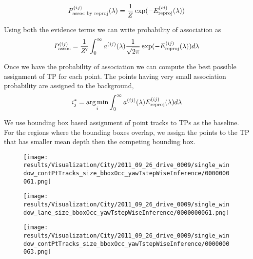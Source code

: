 \begin{align}
  P^{(ij)}_{\text{assoc by reproj}}(\lambda) = \frac{1}{Z}\exp(-E^{(ij)}_{\text{reproj}}(\lambda))
\end{align}

Using both the evidence terms we can write probability of association as
\begin{align}
  P^{(ij)}_{\text{assoc}} = \frac{1}{Z'}\int_0^{\infty} a^{(ij)}(\lambda) \frac{1}{\sqrt{2\pi}}\exp(-E^{(ij)}_{\text{reproj}}(\lambda))d\lambda
  \label{eq:prob-assoc}
\end{align}

Once we have the probability of association we can compute the best possible
assignment of TP for each point. The points having very small association
probability are assigned to the background,
\begin{align}
  i^*_{j} = \operatorname*{\arg\min}_{i} \int_0^\infty a^{(ij)}(\lambda) E^{(ij)}_{\text{reproj}}(\lambda) d\lambda
\end{align}

We use bounding box based assignment of point tracks to TPs as the baseline.
For the regions where the bounding boxes overlap, we assign the points to the
TP that has smaller mean depth then the competing bounding box.

\begin{figure}
        \texttt{[image: results/Visualization/City/2011\_09\_26\_drive\_0009/single\_window\_contPtTracks\_size\_bboxOcc\_yawTstepWiseInference/0000000061.png]}
\end{figure}
\begin{figure}
  \texttt{[image: results/Visualization/City/2011\_09\_26\_drive\_0009/single\_window\_lane\_size\_bboxOcc\_yawTstepWiseInference/0000000061.png]}
\end{figure}
\begin{figure}
  \texttt{[image: results/Visualization/City/2011\_09\_26\_drive\_0009/single\_window\_contPtTracks\_size\_bboxOcc\_yawTstepWiseInference/0000000063.png]}
\end{figure}


